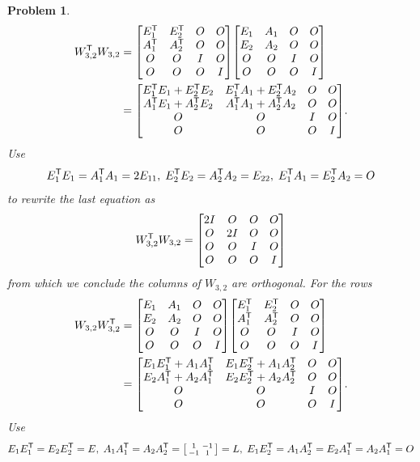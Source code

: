 \documentclass{article}
\theoremstyle{pprop}
\newtheorem{problem}{Problem}[section]
\begin{document}
\begin{problem}
\begin{align*}
W_{3,2}^{\sf T}W_{3,2} & =
\mqty[E_1^{\sf T} & E_2^{\sf T} & O & O \\
A_1^{\sf T} & A_2^{\sf T} & O & O \\
O & O & I & O \\
O & O & O & I 
]
\mqty[ E_1 & A_1 & O & O \\ E_2 & A_2 & O & O \\ O & O & I & O \\ O & O & O & I \\] \\
& =
\mqty[E_1^{\sf T}E_1+E_2^{\sf T}E_2 & E_1^{\sf T}A_1+E_2^{\sf T}A_2 & O & O \\
A_1^{\sf T}E_1+ A_2^{\sf T}E_2& A_1^{\sf T}A_1+ A_2^{\sf T}A_2& O & O \\
O & O & I & O \\
O & O & O & I 
].
\end{align*}
Use 
\[
E_1^{\sf T}E_1=A_1^{\sf T}A_1=2E_{11}, \; E_2^{\sf T}E_2=A_2^{\sf T}A_2=E_{22}, \; E_1^{\sf T}A_1=E_2^{\sf T}A_2=O
\]
to rewrite the last equation as 
\[
W_{3,2}^{\sf T}W_{3,2}  = \mqty[
2I & O & O & O \\
O & 2I & O & O \\
O & O & I & O \\
O & O & O & I 
]
\]
from which we conclude the columns of $W_{3,2}$ are orthogonal. For the rows 
\begin{align*}
W_{3,2} W_{3,2}^{\sf T}& =
\mqty[ E_1 & A_1 & O & O \\ E_2 & A_2 & O & O \\ O & O & I & O \\ O & O & O & I \\]
\mqty[E_1^{\sf T} & E_2^{\sf T} & O & O \\
A_1^{\sf T} & A_2^{\sf T} & O & O \\
O & O & I & O \\
O & O & O & I 
] \\
& =
\mqty[E_1E_1^{\sf T}+A_1A_1^{\sf T} & E_1E_2^{\sf T}+A_1A_2^{\sf T} & O & O \\
E_2A_1^{\sf T}+ A_2A_1^{\sf T}& E_2E_2^{\sf T}+ A_2A_2^{\sf T}& O & O \\
O & O & I & O \\
O & O & O & I 
].  
\end{align*}
Use 
\[
E_1E_1^{\sf T}=E_2E_2^{\sf T}=E, \; A_1A_1^{\sf T}=A_2A_2^{\sf T}=\smqty[1 & -1 \\ -1 & 1]=L, \; E_1E_2^{\sf T}=A_1A_2^{\sf T}=E_2A_1^{\sf T}=A_2A_1^{\sf T}=O
\]
\end{problem}
\end{document}
